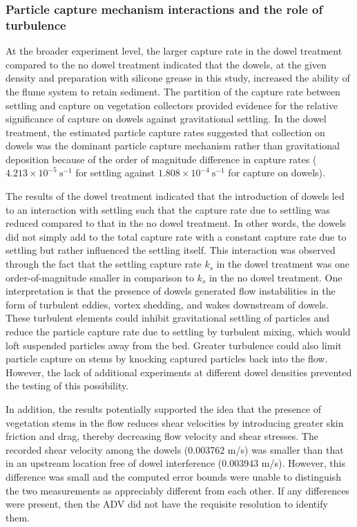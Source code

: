 \documentclass[12pt]{article}
\begin{document}
\subsubsection{Particle capture mechanism interactions and the role of turbulence}

At the broader experiment level, the larger capture rate in the dowel treatment compared to the no dowel treatment indicated that the dowels, at the given density and preparation with silicone grease in this study, increased the ability of the flume system to retain sediment. The partition of the capture rate between settling and capture on vegetation collectors provided evidence for the relative significance of capture on dowels against gravitational settling. In the dowel treatment, the estimated particle capture rates suggested that collection on dowels was the dominant particle capture mechanism rather than gravitational deposition because of the order of magnitude difference in capture rates ($4.213 \times 10^{-5} \ \text{s}^{-1}$ for settling against $1.808 \times 10^{-4} \ \text{s}^{-1}$ for capture on dowels).

The results of the dowel treatment indicated that the introduction of dowels led to an interaction with settling such that the capture rate due to settling was reduced compared to that in the no dowel treatment. In other words, the dowels did not simply add to the total capture rate with a constant capture rate due to settling but rather influenced the settling itself. This interaction was observed through the fact that the settling capture rate $k_s$ in the dowel treatment was one order-of-magnitude smaller in comparison to $k_s$ in the no dowel treatment. One interpretation is that the presence of dowels generated flow instabilities in the form of turbulent eddies, vortex shedding, and wakes downstream of dowels. These turbulent elements could inhibit gravitational settling of particles and reduce the particle capture rate due to settling by turbulent mixing, which would loft suspended particles away from the bed. Greater turbulence could also limit particle capture on stems by knocking captured particles back into the flow. However, the lack of additional experiments at different dowel densities prevented the testing of this possibility.

In addition, the results potentially supported the idea that the presence of vegetation stems in the flow reduces shear velocities by introducing greater skin friction and drag, thereby decreasing flow velocity and shear stresses. The recorded shear velocity among the dowels (0.003762 m/s) was smaller than that in an upstream location free of dowel interference (0.003943 m/s). However, this difference was small and the computed error bounds were unable to distinguish the two measurements as appreciably different from each other. If any differences were present, then the ADV did not have the requisite resolution to identify them.
\end{document}
